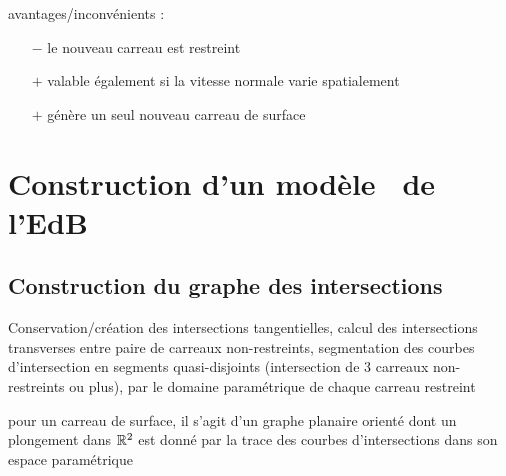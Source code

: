avantages/inconvénients :
\begin{itemize}
	\item[$-$] le nouveau carreau est restreint
	\item[$+$] valable également si la vitesse normale varie spatialement
	\item[$+$] génère un seul nouveau carreau de surface
\end{itemize}








\section{Construction d'un modèle \brep\ de l'EdB}

\subsection{Construction du graphe des intersections}
Conservation/création des intersections tangentielles, calcul des intersections transverses entre paire de carreaux non-restreints, segmentation des courbes d'intersection en segments quasi-disjoints (intersection de 3 carreaux non-restreints ou plus),  par le domaine paramétrique de chaque carreau restreint
\par\bigskip
pour un carreau de surface, il s'agit d'un graphe planaire orienté dont un plongement dans $\mathbb{R}^2$ est donné par la trace des courbes d'intersections dans son espace paramétrique

